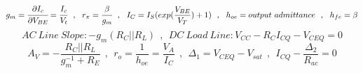$$ g_m = \cfrac{\partial I_c}{\partial V_{BE}} = \cfrac{I_c}{V_t} ~~,~~ r_\pi = \cfrac{\beta}{g_m} ~~ , ~~ I_C = I_S ( exp (\dfrac{V_{BE}}{V_T}) + 1)~~ , ~~ h_{oe} = output~admittance ~~ , ~~ h_{fe} = \beta $$
$$AC~Line~Slope:  -g_m ( R_C || R_L )  ~~ , ~~ DC~Load~Line :  V_{CC} - R_C I_{CQ} - V_{CEQ} = 0 $$
$$ A_V = -\dfrac{R_C || R_L}{g_m^{-1} + R_E} ~~ , ~~ r_o = \frac{1}{h_{oe}} = \frac{V_A}{I_C} ~~ , ~~ {\Delta}_1 = V_{CEQ} - V_{sat} ~~ , ~~ I_{CQ} - \frac{{\Delta}_2}{R_{ac}} = 0 $$
\setlength{\parindent}{0.5cm} %
\par
\lipsum[1]
\par
\setlength{\parindent}{0.0cm} %
\begin{minipage}[b]{.5\textwidth}
\lipsum[1-2]
\end{minipage}%
\noindent
\setlength{\parindent}{0.0cm} 
\hspace*{-\parindent}%
\begin{minipage}[b]{.5\textwidth}
\raggedleft
\lipsum[1-2]
\end{minipage}%

